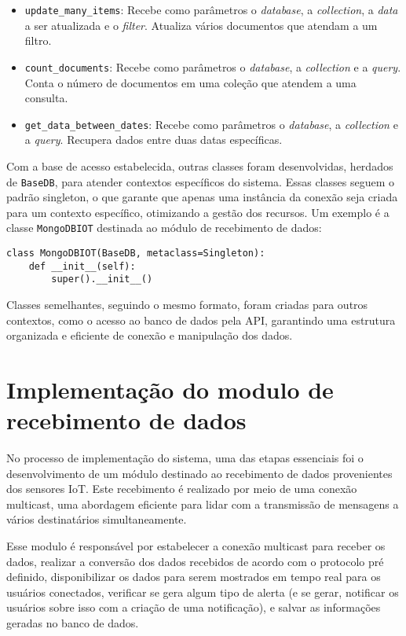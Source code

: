 \begin{itemize}
    \item \texttt{update\_many\_items}: Recebe como parâmetros o \textit{database}, a \textit{collection}, a \textit{data} a ser atualizada e o \textit{filter}. Atualiza vários documentos que atendam a um filtro.
    
    \item \texttt{count\_documents}: Recebe como parâmetros o \textit{database}, a \textit{collection} e a \textit{query}. Conta o número de documentos em uma coleção que atendem a uma consulta.
    
    \item \texttt{get\_data\_between\_dates}: Recebe como parâmetros o \textit{database}, a \textit{collection} e a \textit{query}. Recupera dados entre duas datas específicas.
\end{itemize}


Com a base de acesso estabelecida, outras classes foram desenvolvidas, herdados de \texttt{BaseDB}, para atender contextos específicos do sistema. Essas classes seguem o padrão singleton, o que garante que apenas uma instância da conexão seja criada para um contexto específico, otimizando a gestão dos recursos. Um exemplo é a classe \texttt{MongoDBIOT} destinada ao módulo de recebimento de dados:

\begin{verbatim}
class MongoDBIOT(BaseDB, metaclass=Singleton):
    def __init__(self):
        super().__init__()
\end{verbatim}

Classes semelhantes, seguindo o mesmo formato, foram criadas para outros contextos, como o acesso ao banco de dados pela API, garantindo uma estrutura organizada e eficiente de conexão e manipulação dos dados.

\section[Implementação do modulo de recebimento de dados]{Implementação do modulo de recebimento de dados}\label{sec:Implementação do modulo de recebimento de dados}

No processo de implementação do sistema, uma das etapas essenciais foi o desenvolvimento de um módulo destinado ao recebimento de dados provenientes dos sensores IoT. Este recebimento é realizado por meio de uma conexão multicast, uma abordagem eficiente para lidar com a transmissão de mensagens a vários destinatários simultaneamente.

Esse modulo é responsável por estabelecer a conexão multicast para receber os dados, realizar a conversão dos dados recebidos de acordo com o protocolo pré definido, disponibilizar os dados para serem mostrados em tempo real para os usuários conectados, verificar se gera algum tipo de alerta (e se gerar, notificar os usuários sobre isso com a criação de uma notificação), e salvar as informações geradas no banco de dados.

